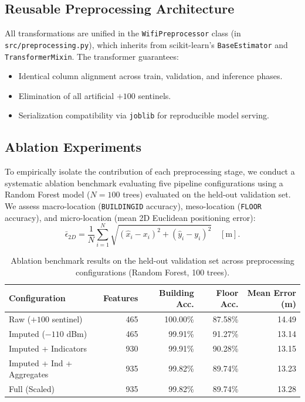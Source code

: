\subsection{Reusable Preprocessing Architecture}

All transformations are unified in the \texttt{WifiPreprocessor} class (in \texttt{src/preprocessing.py}),
which inherits from scikit-learn's \texttt{BaseEstimator} and \texttt{TransformerMixin}.
The transformer guarantees:
\begin{itemize}
  \item Identical column alignment across train, validation, and inference phases.
  \item Elimination of all artificial $+100$ sentinels.
  \item Serialization compatibility via \texttt{joblib} for reproducible model serving.
\end{itemize}

\subsection{Ablation Experiments}
\label{sec:ablation}

To empirically isolate the contribution of each preprocessing stage, we conduct a systematic ablation benchmark
evaluating five pipeline configurations using a Random Forest model ($N=100$ trees) evaluated on the held-out validation set.
We assess macro-location (\texttt{BUILDINGID} accuracy), meso-location (\texttt{FLOOR} accuracy), and micro-location
(mean 2D Euclidean positioning error):
\[
  \bar{\epsilon}_{2D} = \frac{1}{N} \sum_{i=1}^N \sqrt{(\hat{x}_i - x_i)^2 + (\hat{y}_i - y_i)^2} \quad [\text{m}].
\]

\begin{table}[!t]
\centering
\caption{Ablation benchmark results on the held-out validation set across preprocessing configurations (Random Forest, 100 trees).}
\label{tab:ablation}
\begin{tabular}{lrrrr}
\toprule
\textbf{Configuration} & \textbf{Features} & \textbf{Building Acc.} & \textbf{Floor Acc.} & \textbf{Mean Error (m)} \\
\midrule
Raw ($+100$ sentinel)      & 465 & 100.00\% & 87.58\% & 14.49 \\
Imputed ($-110$ dBm)       & 465 & 99.91\%  & 91.27\% & 13.14 \\
Imputed + Indicators       & 930 & 99.91\%  & 90.28\% & 13.15 \\
Imputed + Ind + Aggregates & 935 & 99.82\%  & 89.74\% & 13.23 \\
Full (Scaled)              & 935 & 99.82\%  & 89.74\% & 13.28 \\
\bottomrule
\end{tabular}
\end{table}

